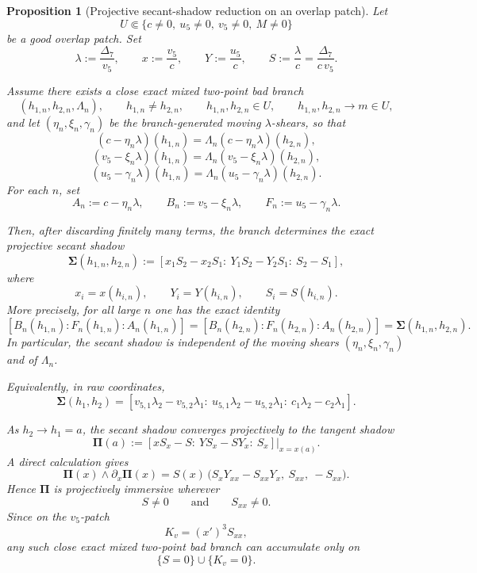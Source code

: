 \documentclass[11pt,a4paper]{amsart}
\theoremstyle{plain}
\newtheorem{proposition}[theorem]{Proposition}
\theoremstyle{definition}
\begin{document}
\begin{proposition}[Projective secant-shadow reduction on an overlap patch]
\label{prop:conditional-mixed-lambda-shear-projective-shadow-reduction}
Let
\[
U\Subset\{c\neq 0,\ u_5\neq 0,\ v_5\neq 0,\ M\neq 0\}
\]
be a good overlap patch. Set
\[
\lambda:=\frac{\Delta_7}{v_5},
\qquad
x:=\frac{v_5}{c},
\qquad
Y:=\frac{u_5}{c},
\qquad
S:=\frac{\lambda}{c}=\frac{\Delta_7}{c\,v_5}.
\]

Assume there exists a close exact mixed two-point bad branch
\[
(h_{1,n},h_{2,n},\Lambda_n),
\qquad
h_{1,n}\neq h_{2,n},
\qquad
h_{1,n},h_{2,n}\in U,
\qquad
h_{1,n},h_{2,n}\to m\in U,
\]
and let $(\eta_n,\xi_n,\gamma_n)$ be the branch-generated moving
$\lambda$-shears, so that
\[
(c-\eta_n\lambda)(h_{1,n})=\Lambda_n(c-\eta_n\lambda)(h_{2,n}),
\]
\[
(v_5-\xi_n\lambda)(h_{1,n})=\Lambda_n(v_5-\xi_n\lambda)(h_{2,n}),
\]
\[
(u_5-\gamma_n\lambda)(h_{1,n})=\Lambda_n(u_5-\gamma_n\lambda)(h_{2,n}).
\]
For each $n$, set
\[
A_n:=c-\eta_n\lambda,
\qquad
B_n:=v_5-\xi_n\lambda,
\qquad
F_n:=u_5-\gamma_n\lambda.
\]

Then, after discarding finitely many terms, the branch determines the exact
projective secant shadow
\[
\mathbf\Sigma(h_{1,n},h_{2,n})
:=
[x_1S_2-x_2S_1:\ Y_1S_2-Y_2S_1:\ S_2-S_1],
\]
where
\[
x_i=x(h_{i,n}),
\qquad
Y_i=Y(h_{i,n}),
\qquad
S_i=S(h_{i,n}).
\]
More precisely, for all large $n$ one has the exact identity
\[
[B_n(h_{1,n}):F_n(h_{1,n}):A_n(h_{1,n})]
=
[B_n(h_{2,n}):F_n(h_{2,n}):A_n(h_{2,n})]
=
\mathbf\Sigma(h_{1,n},h_{2,n}).
\]
In particular, the secant shadow is independent of the moving shears
$(\eta_n,\xi_n,\gamma_n)$ and of $\Lambda_n$.

Equivalently, in raw coordinates,
\[
\mathbf\Sigma(h_1,h_2)
=
[v_{5,1}\lambda_2-v_{5,2}\lambda_1:\ u_{5,1}\lambda_2-u_{5,2}\lambda_1:\ c_1\lambda_2-c_2\lambda_1].
\]

As $h_2\to h_1=a$, the secant shadow converges projectively to the tangent
shadow
\[
\mathbf\Pi(a)
:=
[xS_x-S:\ YS_x-SY_x:\ S_x]\big|_{x=x(a)}.
\]
A direct calculation gives
\[
\mathbf\Pi(x)\wedge \partial_x\mathbf\Pi(x)
=
S(x)\,
\bigl(
S_xY_{xx}-S_{xx}Y_x,\ S_{xx},\ -S_{xx}
\bigr).
\]
Hence $\mathbf\Pi$ is projectively immersive wherever
\[
S\neq 0
\qquad\text{and}\qquad
S_{xx}\neq 0.
\]
Since on the $v_5$-patch
\[
K_v=(x')^3S_{xx},
\]
any such close exact mixed two-point bad branch can accumulate only on
\[
\{S=0\}\cup\{K_v=0\}.
\]
\end{proposition}
\end{document}
